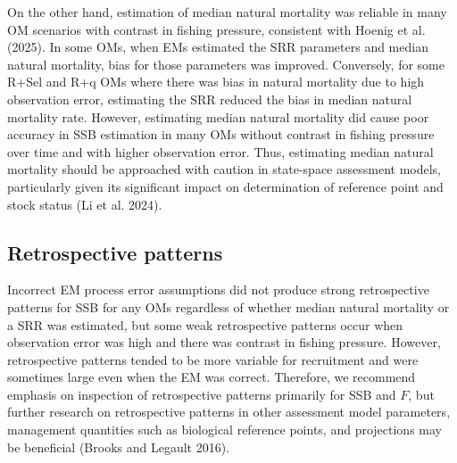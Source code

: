 \documentclass[
  12pt,
]{article}
\begin{document}
On the other hand, estimation of median natural mortality was reliable
in many OM scenarios with contrast in fishing pressure, consistent with
Hoenig et al. (2025). In some OMs, when EMs estimated the SRR parameters
and median natural mortality, bias for those parameters was improved.
Conversely, for some R+Sel and R+q OMs where there was bias in natural
mortality due to high observation error, estimating the SRR reduced the
bias in median natural mortality rate. However, estimating median
natural mortality did cause poor accuracy in SSB estimation in many OMs
without contrast in fishing pressure over time and with higher
observation error. Thus, estimating median natural mortality should be
approached with caution in state-space assessment models, particularly
given its significant impact on determination of reference point and
stock status (Li et al. 2024).

\hypertarget{retrospective-patterns}{%
\subsection*{Retrospective patterns}\label{retrospective-patterns}}

Incorrect EM process error assumptions did not produce strong
retrospective patterns for SSB for any OMs regardless of whether median
natural mortality or a SRR was estimated, but some weak retrospective
patterns occur when observation error was high and there was contrast in
fishing pressure. However, retrospective patterns tended to be more
variable for recruitment and were sometimes large even when the EM was
correct. Therefore, we recommend emphasis on inspection of retrospective
patterns primarily for SSB and \(F\), but further research on
retrospective patterns in other assessment model parameters, management
quantities such as biological reference points, and projections may be
beneficial (Brooks and Legault 2016).
\end{document}
